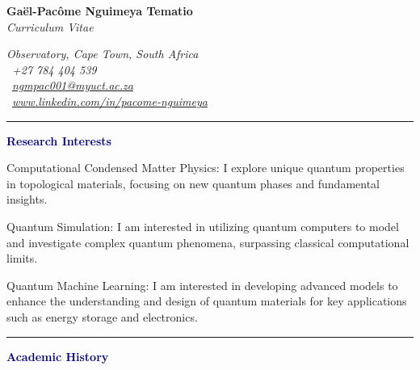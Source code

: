 \documentclass[12pt, a4paper]{article}
\newcommand{\customheader}[2]{
	\noindent
	\hspace{0.6cm}
	\textcolor{darkblue}{\rule[0.5ex]{3.35cm}{0.15cm}} %
	\hspace{0.05cm} %
	\textcolor{darkblue}{\textbf{\large #2}} %
}
\begin{document}
\begin{minipage}[t]{0.48\textwidth}
	\vspace{-0.5cm}
	{\bfseries\color{darkblue}\Large  Gaël-Pacôme Nguimeya Tematio}\\[0.5cm] %
	\textcolor{black!70}{\itshape\Large Curriculum Vitae}
\end{minipage}
\begin{minipage}[t]{0.50\textwidth}
	\raggedleft %
	\textcolor{black!70}{\small\itshape Observatory, Cape Town, South Africa}\\[0.0cm]
	\textcolor{black!70}{\scalebox{0.7}{\faPhone}\ \small\itshape +27 784 404 539} \\[0.2em] %
	\textcolor{black!70}{\scalebox{0.7}{\faEnvelopeO}\ \small\itshape \href{mailto:ngmpac001@myuct.ac.za}{ngmpac001@myuct.ac.za}} \\[0.2em] %
	\textcolor{black!70}{\scalebox{0.7}{\faGlobe}\ \small\itshape \href{https://www.linkedin.com/in/pacome-nguimeya/}{www.linkedin.com/in/pacome-nguimeya}} %
\end{minipage}

\vspace{0.8cm}
\customheader{}{\large Research Interests}
\vspace{0.1cm}

\begin{minipage}[t]{0.203\textwidth}
	\hspace{0.1cm}
\end{minipage}
\begin{minipage}[t]{0.80\textwidth}
Computational Condensed Matter Physics: I explore unique quantum properties in topological materials, focusing on new quantum phases and fundamental insights.\vspace{0.2cm}

Quantum Simulation: I am interested in utilizing quantum computers to model and investigate complex quantum phenomena, surpassing classical computational limits.\vspace{0.2cm}

Quantum Machine Learning: I am interested in developing advanced models to enhance the understanding and design of quantum materials for key applications such as energy storage and electronics.
\end{minipage}

\vspace{0.2cm}
\customheader{}{\large Academic History}
\vspace{0.2cm}
\end{document}

